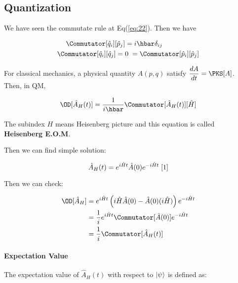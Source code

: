 \documentclass[final]{IEEEphot}
\newcommand{\hq}{\hat{q}}
\newcommand{\hp}{\hat{p}}
\newcommand{\hH}{\hat{H}}
\newcommand{\hA}{\hat{A}}
\newcommand{\TE}[1]{e^{#1 i\hH t}}
\newcommand{\BKS}[1]{\left( #1 \right)} %
\newcommand{\hket}[1][\psi]{\ket{#1}} %
\newcommand{\VS}{\vspace{0.3cm}} %
\newcommand{\hs}{\hspace{0.1cm}} %
\newcommand{\vs}{\vspace{0.1cm}} %
\begin{document}
\newpage

\subsection{Quantization}

We have seen the commutate rule at Eq(\ref{eq:22}). Then we have

\begin{gather}
\begin{split}
 \Commutator[\hq_i][\hp_j] &= i\hbar \delta_{ij} \\
 \Commutator[\hq_i][\hq_j] =\hs& 0\hs = \Commutator[\hp_i][\hp_j]
\end{split}
\end{gather}

For classical mechanics, a physical quantity $A(p,q)$ satisfy $\dfrac{dA}{dt} = \PKS[A]$. Then, in QM, 

\vs

\begin{equation*}
 \OD[\hat{A}_H(t)] = \frac{1}{i\hbar} \Commutator[\hat{A}_H(t)][\hH]
\end{equation*}

The subindex $H$ means Heisenberg picture and this equation is called \textbf{Heisenberg E.O.M}. 

Then we can find simple solution:

\begin{equation}
 \hA_H(t) = \TE{} \hA(0) \TE{-} \hs \footnotemark[1]
\end{equation}


Then we can check:

\begin{equation}
 \begin{split}
  \OD[\hA_H] &= \TE{}\BKS{i\hH \hA(0) - \hA(0) (i\hH) } \TE{-} \\
	     &= \frac{1}{i} \TE{} \Commutator[\hA(0)] \TE{-} \\
	     &= \frac{1}{i} \Commutator[\hA_H(t)]
 \end{split}
\end{equation}

\VS

\paragraph{Expectation Value}

The expectation value of $\hA_H(t)$ with respect to $\hket$ is defined as:
\end{document}
